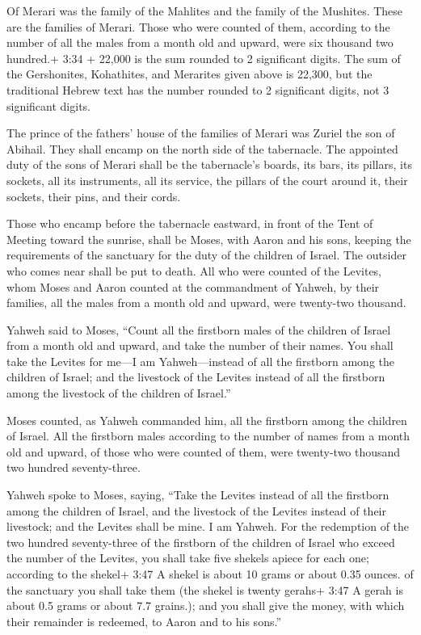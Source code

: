  Of Merari was the family of the Mahlites and the family of
the Mushites. These are the families of Merari.  Those who
were counted of them, according to the number of all the males from a
month old and upward, were six thousand two hundred.+ 3:34 + 22,000 is
the sum rounded to 2 significant digits. The sum of the Gershonites,
Kohathites, and Merarites given above is 22,300, but the traditional
Hebrew text has the number rounded to 2 significant digits, not 3
significant digits.

 The prince of the fathers' house of the families of Merari
was Zuriel the son of Abihail. They shall encamp on the north side of
the tabernacle.  The appointed duty of the sons of Merari
shall be the tabernacle's boards, its bars, its pillars, its sockets,
all its instruments, all its service,  the pillars of the
court around it, their sockets, their pins, and their cords.

 Those who encamp before the tabernacle eastward, in front
of the Tent of Meeting toward the sunrise, shall be Moses, with Aaron
and his sons, keeping the requirements of the sanctuary for the duty of
the children of Israel. The outsider who comes near shall be put to
death.  All who were counted of the Levites, whom Moses and
Aaron counted at the commandment of Yahweh, by their families, all the
males from a month old and upward, were twenty-two thousand.

 Yahweh said to Moses, ``Count all the firstborn males of
the children of Israel from a month old and upward, and take the number
of their names.  You shall take the Levites for me---I am
Yahweh---instead of all the firstborn among the children of Israel; and
the livestock of the Levites instead of all the firstborn among the
livestock of the children of Israel.''

 Moses counted, as Yahweh commanded him, all the firstborn
among the children of Israel.  All the firstborn males
according to the number of names from a month old and upward, of those
who were counted of them, were twenty-two thousand two hundred
seventy-three.

 Yahweh spoke to Moses, saying,  ``Take the
Levites instead of all the firstborn among the children of Israel, and
the livestock of the Levites instead of their livestock; and the Levites
shall be mine. I am Yahweh.  For the redemption of the two
hundred seventy-three of the firstborn of the children of Israel who
exceed the number of the Levites,  you shall take five
shekels apiece for each one; according to the shekel+ 3:47 A shekel is
about 10 grams or about 0.35 ounces. of the sanctuary you shall take
them (the shekel is twenty gerahs+ 3:47 A gerah is about 0.5 grams or
about 7.7 grains.);  and you shall give the money, with
which their remainder is redeemed, to Aaron and to his sons.''

